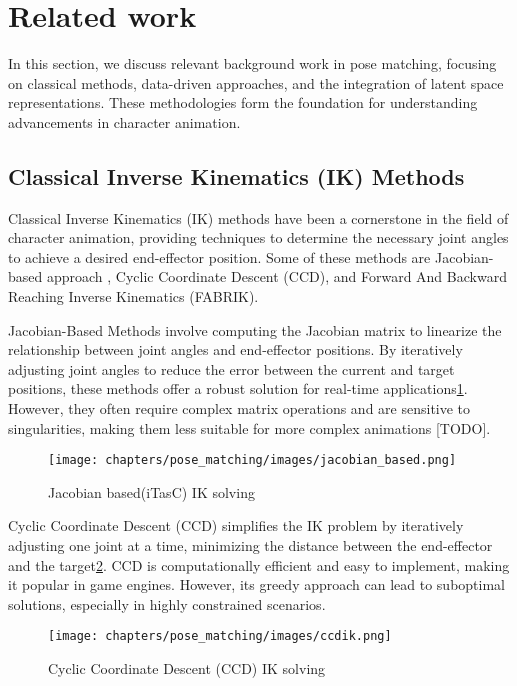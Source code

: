 \documentclass[../../main.tex]{subfiles}
\begin{document}
\section{Related work}

In this section, we discuss relevant background work in pose matching, focusing on classical methods, data-driven approaches, and the integration of latent space representations. These methodologies form the foundation for understanding advancements in character animation.

\subsection{Classical Inverse Kinematics (IK) Methods}

Classical Inverse Kinematics (IK) methods have been a cornerstone in the field of character animation, providing techniques to determine the necessary joint angles to achieve a desired end-effector position. Some of these methods are Jacobian-based approach \cite{TODO itasc}, Cyclic Coordinate Descent (CCD)\cite{TODO}, and Forward And Backward Reaching Inverse Kinematics (FABRIK)\cite{TODO}.

Jacobian-Based Methods involve computing the Jacobian matrix to linearize the relationship between joint angles and end-effector positions. By iteratively adjusting joint angles to reduce the error between the current and target positions, these methods offer a robust solution for real-time applications\ref{fig:jacobian_based}. However, they often require complex matrix operations and are sensitive to singularities, making them less suitable for more complex animations [TODO].

\begin{figure}
    \centering \texttt{[image: chapters/pose\_matching/images/jacobian\_based.png]}
    \caption{Jacobian based(iTasC) IK solving}
    \label{fig:jacobian_based}
\end{figure}

Cyclic Coordinate Descent (CCD) simplifies the IK problem by iteratively adjusting one joint at a time, minimizing the distance between the end-effector and the target\ref{fig:ccdik}. CCD is computationally efficient and easy to implement, making it popular in game engines. However, its greedy approach can lead to suboptimal solutions, especially in highly constrained scenarios\cite{TODO}.

\begin{figure}
  \centering \texttt{[image: chapters/pose\_matching/images/ccdik.png]}
  \caption{Cyclic Coordinate Descent (CCD) IK solving}
  \label{fig:ccdik}
\end{figure}
\end{document}
